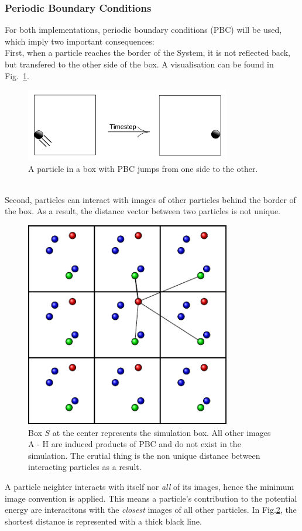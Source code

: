 \subsubsection*{Periodic Boundary Conditions}
For both implementations, periodic boundary conditions (PBC) will be used, which imply two important consequences: \smallskip\\
First, when a particle reaches the border of the System, it is not reflected back, but transfered to the other side of the box.
A visualisation can be found in Fig.~\ref{Fig:PBCJump}.
\begin{figure}[h!]
\centering
\includegraphics[width=0.8\textwidth]{Figures/PBCjump.pdf}
\caption[PBC: Jump Case]{A particle in a box with PBC jumps from one side to the other.}
\label{Fig:PBCJump}
\end{figure}\\
Second, particles can interact with images of other particles behind the border of the box. As a result, the distance vector between two particles is not unique.
\begin{figure}[h!]
\centering
\includegraphics[width=0.8\textwidth]{Figures/tikz/MinimalDistance.pdf}
\caption[PBC: Interaction Case]{Box $S$ at the center represents the simulation box.
All other images A - H are induced products of PBC and do not exist in the simulation.
The crutial thing is the non unique distance between interacting particles as a result.}
\label{PBCinteraction}
\end{figure}
A particle neighter interacts with itself nor {\em all} of its images, hence the minimum image convention is applied.
This means a particle's contribution to the potential energy are interacitons with the {\em closest} images of all other particles.
In Fig.\ref{PBCinteraction}, the shortest distance is represented with a thick black line.





